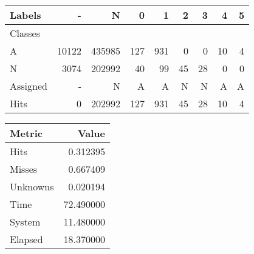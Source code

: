 \begin{tabular}{l|r|r|r|r|r|r|r|r}

Labels &      - &       N &    0 &    1 &   2 &   3 &   4 &  5 \\\hline
Classes  &        &         &      &      &     &     &     &    \\\hline
\hline
A        &  10122 &  435985 &  127 &  931 &   0 &   0 &  10 &  4 \\\hline
N        &   3074 &  202992 &   40 &   99 &  45 &  28 &   0 &  0 \\\hline
\hline
Assigned &      - &       N &    A &    A &   N &   N &   A &  A \\\hline
Hits     &      0 &  202992 &  127 &  931 &  45 &  28 &  10 &  4 
\end{tabular}
\begin{tabular}{l|r}

Metric   &      Value \\\hline
\hline
Hits     &   0.312395 \\\hline
Misses   &   0.667409 \\\hline
Unknowns &   0.020194 \\\hline
Time     &  72.490000 \\\hline
System   &  11.480000 \\\hline
Elapsed  &  18.370000 
\end{tabular}
